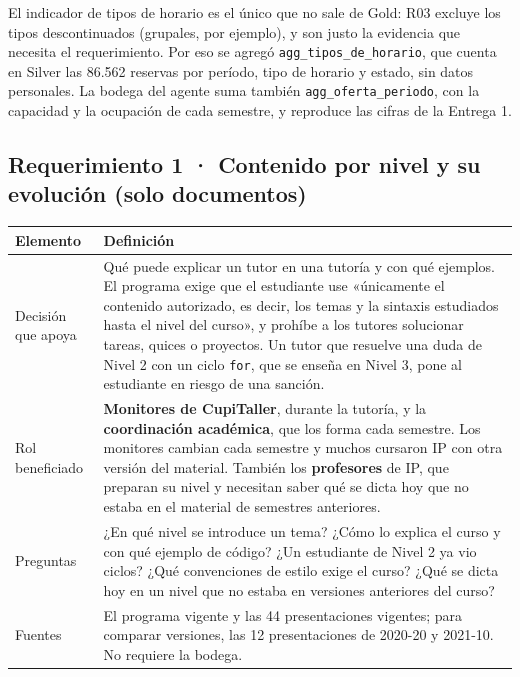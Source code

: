 \documentclass[11pt,letterpaper]{article}
\newcommand{\cod}[1]{\texttt{\small #1}}
\begin{document}
El indicador de tipos de horario es el único que no sale de Gold: R03 excluye los tipos descontinuados (grupales, por ejemplo), y son justo la evidencia que necesita el requerimiento. Por eso se agregó \cod{agg\_tipos\_de\_horario}, que cuenta en Silver las 86.562 reservas por período, tipo de horario y estado, sin datos personales. La bodega del agente suma también \cod{agg\_oferta\_periodo}, con la capacidad y la ocupación de cada semestre, y reproduce las cifras de la Entrega 1.


\subsection{Requerimiento 1 · Contenido por nivel y su evolución (solo documentos)}

\begin{table}[H]\small\renewcommand{\arraystretch}{1.2}
\begin{tabularx}{\textwidth}{>{\raggedright\arraybackslash}p{}L}
\toprule
\textbf{Elemento} & \textbf{Definición} \\
\midrule
Decisión que apoya & Qué puede explicar un tutor en una tutoría y con qué ejemplos. El programa exige que el estudiante use «únicamente el contenido autorizado, es decir, los temas y la sintaxis estudiados hasta el nivel del curso», y prohíbe a los tutores solucionar tareas, quices o proyectos. Un tutor que resuelve una duda de Nivel 2 con un ciclo \cod{for}, que se enseña en Nivel 3, pone al estudiante en riesgo de una sanción. \\
Rol beneficiado & \textbf{Monitores de CupiTaller}, durante la tutoría, y la \textbf{coordinación académica}, que los forma cada semestre. Los monitores cambian cada semestre y muchos cursaron IP con otra versión del material. También los \textbf{profesores} de IP, que preparan su nivel y necesitan saber qué se dicta hoy que no estaba en el material de semestres anteriores. \\
Preguntas & ¿En qué nivel se introduce un tema? ¿Cómo lo explica el curso y con qué ejemplo de código? ¿Un estudiante de Nivel 2 ya vio ciclos? ¿Qué convenciones de estilo exige el curso? ¿Qué se dicta hoy en un nivel que no estaba en versiones anteriores del curso? \\
Fuentes & El programa vigente y las 44 presentaciones vigentes; para comparar versiones, las 12 presentaciones de 2020-20 y 2021-10. No requiere la bodega. \\
\bottomrule
\end{tabularx}
\end{table}
\end{document}
